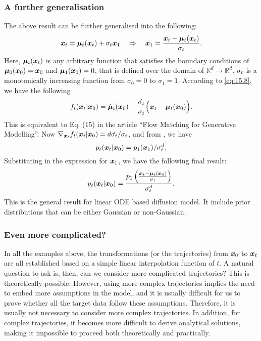 \subsubsection{A further generalisation}
The above result can be further generalised into the following:
\begin{equation}
    \label{eq:15.21}
\bm{x}_{t}=\bm{\mu}_t(\bm{x}_{t})+\sigma_t\bm{x}_1 \quad \Rightarrow\quad \bm{x}_1 =\frac{\bm{x}_{t}-\bm{\mu}_t(\bm{x}_t)}{\sigma_t}.
\end{equation}
Here, $\bm{\mu}_t(\bm{x}_{t})$ is any arbitrary function that satisfies the boundary conditions of $\bm{\mu}_0(\bm{x}_0)=\bm{x}_0$ and $\bm{\mu}_1(\bm{x}_0)=0$, that is defined over the domain of $\mathbb{R}^d\to\mathbb{R}^{d}$. $\sigma_t$ is a monotonically increasing function from $\sigma_0=0$ to $\sigma_1=1$. According to \cref{eq:15.8}, we have the following
\begin{equation}
    \label{eq:15.22}
    f_t(\bm{x}_{t}|\bm{x}_0)=\dot{\bm{\mu}}_t(\bm{x}_0)+\frac{\dot{\sigma_t}}{\sigma_t}\Bigl(\bm{x}_{t} -\bm{\mu}_t(\bm{x}_0) \Bigr).
\end{equation}
This is equivalent to Eq. (15) in the article ``Flow Matching for Generative Modelling''. Now $\nabla_{\bm{x}_{t}}f_t(\bm{x}_{t}|\bm{x}_0)= d\dot{\sigma_t}/\sigma_t$, and from , we have 
\begin{equation}
    \label{eq:15.23}
p_t(\bm{x}_{t}|\bm{x}_0)=p_1 (\bm{x}_1)/\sigma_t^d.
\end{equation}
Substituting in the expression for $\bm{x}_1$, we have the following final result:
\begin{equation}
    \label{eq:15.24}
p_t(\bm{x}_{t}|\bm{x}_0)=\frac{p_1 \left(\frac{\bm{x}_{t}-\bm{\mu}_t(\bm{x}_0)}{\sigma_t}\right)}{\sigma_t^d}.
\end{equation}
This is the general result for linear ODE based diffusion model. It include prior distributions that can be either Gaussian or non-Gaussian.

\subsubsection{Even more complicated?}
In all the examples above, the transformations (or the trajectories) from $\bm{x}_0$ to $\bm{x}_{t}$ are all established based on a simple linear interpolation function of $t$. A natural question to ask is, then, can we consider more complicated trajectories? This is theoretically possible. However, using more complex trajectories implies the need to embed more assumptions in the model, and it is usually difficult for us to prove whether all the target data follow these assumptions. Therefore, it is usually not necessary to consider more complex trajectories. In addition, for complex trajectories, it becomes more difficult to derive analytical solutions, making it impossible to proceed both theoretically and practically.

